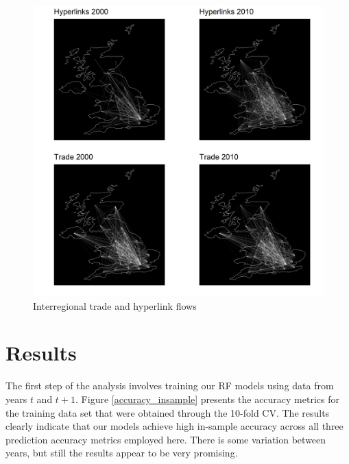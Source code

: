 \documentclass[]{interact}
\theoremstyle{plain}%
\theoremstyle{definition}
\theoremstyle{remark}
\begin{document}
\begin{figure}[p]
\includegraphics[width=1\linewidth]{figures/flow_maps} \caption{\label{Flow_maps} Interregional trade and hyperlink flows}\label{fig:unnamed-chunk-2}
\end{figure}

\hypertarget{sec:5}{%
\section{Results}\label{sec:5}}

The first step of the analysis involves training our RF models using
data from years \(t\) and \(t + 1\). Figure \ref{accuracy_insample}
presents the accuracy metrics for the training data set that were
obtained through the 10-fold CV. The results clearly indicate that our
models achieve high in-sample accuracy across all three prediction
accuracy metrics employed here. There is some variation between years,
but still the results appear to be very promising.
\end{document}
